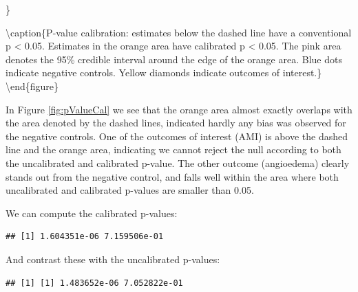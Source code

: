 \documentclass[11pt]{book}
\newenvironment{Shaded}{\begin{snugshade}}{\end{snugshade}}
\newcommand{\KeywordTok}[1]{\textcolor[rgb]{0.13,0.29,0.53}{\textbf{#1}}}
\newcommand{\DataTypeTok}[1]{\textcolor[rgb]{0.13,0.29,0.53}{#1}}
\newcommand{\StringTok}[1]{\textcolor[rgb]{0.31,0.60,0.02}{#1}}
\newcommand{\OperatorTok}[1]{\textcolor[rgb]{0.81,0.36,0.00}{\textbf{#1}}}
\newcommand{\NormalTok}[1]{#1}
\begin{document}
\}

\textbackslash{}caption\{P-value calibration: estimates below the dashed
line have a conventional p \textless{} 0.05. Estimates in the orange
area have calibrated p \textless{} 0.05. The pink area denotes the 95\%
credible interval around the edge of the orange area. Blue dots indicate
negative controls. Yellow diamonds indicate outcomes of
interest.\}\label{fig:pValueCal} \textbackslash{}end\{figure\}

In Figure \ref{fig:pValueCal} we see that the orange area almost exactly
overlaps with the area denoted by the dashed lines, indicated hardly any
bias was observed for the negative controls. One of the outcomes of
interest (AMI) is above the dashed line and the orange area, indicating
we cannot reject the null according to both the uncalibrated and
calibrated p-value. The other outcome (angioedema) clearly stands out
from the negative control, and falls well within the area where both
uncalibrated and calibrated p-values are smaller than 0.05.

We can compute the calibrated p-values:

\begin{Shaded}
\end{Shaded}

\begin{verbatim}
## [1] 1.604351e-06 7.159506e-01
\end{verbatim}

And contrast these with the uncalibrated p-values:

\begin{Shaded}
\end{Shaded}

\begin{verbatim}
## [1] [1] 1.483652e-06 7.052822e-01
\end{verbatim}
\end{document}
